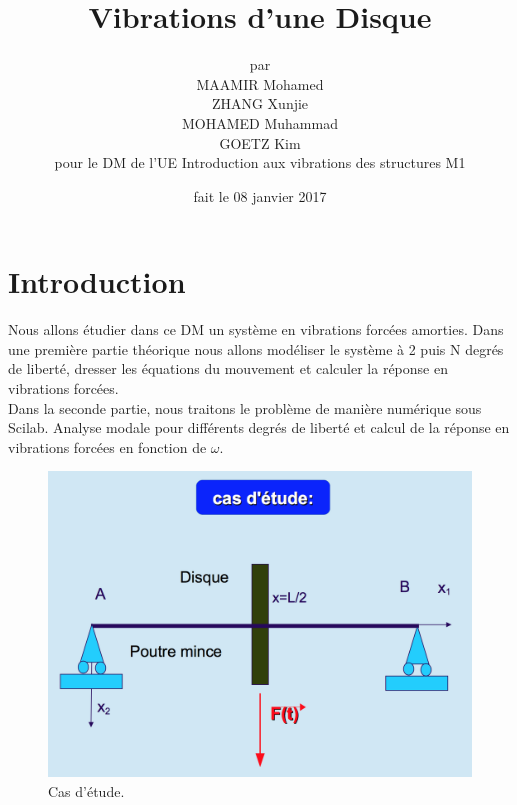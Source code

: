 \documentclass[a4paper,10pt]{report} %
\title{\textbf{Vibrations d'une Disque}} %
\author{par\\MAAMIR Mohamed\\ZHANG Xunjie\\MOHAMED Muhammad\\GOETZ Kim\\pour le DM de l'UE Introduction aux vibrations des structures M1} %
\date{fait le 08 janvier 2017} %
\begin{document}
\maketitle %
\tableofcontents %
\listoffigures %












\chapter{Introduction} %

Nous allons étudier dans ce DM un système en vibrations forcées amorties. Dans une première partie théorique nous allons modéliser le système à 2 puis N degrés de liberté, dresser les équations du mouvement et calculer la réponse en vibrations forcées. \\ Dans la seconde partie, nous traitons le problème de manière numérique sous Scilab. Analyse modale pour différents degrés de liberté et calcul de la réponse en vibrations forcées en fonction de $\omega$.


\begin{figure}[H]
\begin{center}
	\includegraphics[width=1\textwidth]{sujet.png} 
\end{center} 
\caption{Cas d'étude.}
\end{figure}
\end{document}
